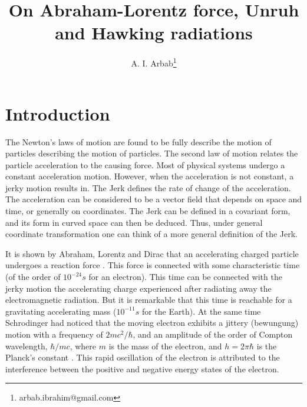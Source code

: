 \documentclass[a4]{epl2}
\title{\textcolor[rgb]{0.00,0.00,1.00}{{On Abraham-Lorentz force, Unruh and Hawking radiations}}}
\author{\textcolor[rgb]{0.00,0.00,0.00}{A. I. Arbab}\inst{}\footnote{\textcolor[rgb]{0.00,0.00,0.00}{arbab.ibrahim@gmail.com}}}
\institute{\inst{}
Department of Physics,
College  of Science, Qassim University, P.O. Box 6644, Buraidah 51452, KSA}
\begin{document}
\maketitle
\baselineskip=19pt


\section{\textcolor[rgb]{0.00,0.07,1.00}{Introduction}}

The Newton's laws of motion are found to be fully describe the motion of particles describing the motion of  particles. The second law of motion relates the particle acceleration to the causing force. Most of physical systems undergo a constant acceleration motion. However, when the acceleration is not constant, a jerky motion results in. The Jerk defines the rate of change of the acceleration. The acceleration can  be considered to be a vector field that depends on space and time, or generally on coordinates. The Jerk can be defined in a covariant form, and  its form in curved space can then be deduced. Thus, under general coordinate transformation one can think of a more general definition of the Jerk.

It is shown by Abraham, Lorentz and Dirac that an accelerating charged particle undergoes a reaction force \textcolor[rgb]{0.00,0.07,1.00}{\cite{abraham, lorentz, dirac}}. This force is connected with some characteristic time (of the order of $10^{-24}s$ for an electron). This time can be connected with the jerky  motion the accelerating charge experienced after radiating away the electromagnetic radiation. But it is remarkable that this time is reachable for a gravitating accelerating mass ($10^{-11}s$ for the Earth). At the same time Schrodinger had noticed that the moving electron exhibits a jittery (bewungung) motion with a frequency of $2mc^2/\hbar$, and an amplitude of the order of Compton wavelength, $\hbar/mc$, where $m$ is the mass of the electron, and $h=2\pi\hbar$ is the Planck's constant \textcolor[rgb]{0.00,0.07,1.00}{\cite{schrod}}. This rapid oscillation of the electron is attributed to the interference between the positive and negative energy states of the electron.
\end{document}
